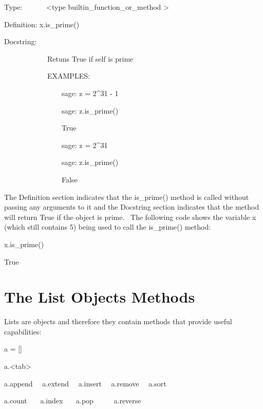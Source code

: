 \documentclass[12pt,twoside]{book}
\begin{document}
Type: \ \ \ \ \ \ {\textless}type {\textquotesingle}builtin\_function\_or\_method {\textquotesingle}{\textgreater}

Definition: x.is\_prime()


\bigskip

Docstring: 


\bigskip

\ \ \ \ \ \ \ \ \ \ \ \ Retuns True if self is prime 


\bigskip

\ \ \ \ \ \ \ \ \ \ \ \ EXAMPLES: 

\ \ \ \ \ \ \ \ \ \ \ \ \ \ \ \ sage: z = 2\^{}31 {}- 1 

\ \ \ \ \ \ \ \ \ \ \ \ \ \ \ \ sage: z.is\_prime() 

\ \ \ \ \ \ \ \ \ \ \ \ \ \ \ \ True 

\ \ \ \ \ \ \ \ \ \ \ \ \ \ \ \ sage: z = 2\^{}31 

\ \ \ \ \ \ \ \ \ \ \ \ \ \ \ \ sage: z.is\_prime() 

\ \ \ \ \ \ \ \ \ \ \ \ \ \ \ \ False 


\bigskip

The Definition section indicates that the is\_prime() method is called without passing any arguments to it and the Docstring section indicates that the method will return True if the object is prime. \ The following code shows the variable x (which still contains 5) being used to call the is\_prime() method: 

\bigskip

x.is\_prime()

{\textbar}

True

\section[The List Object{\textquotesingle}s Methods]{ The List Object{\textquotesingle}s Methods}

Lists are objects and therefore they contain methods that provide useful capabilities: 

\bigskip

a = []

a.{\textless}tab{\textgreater}

{\textbar}

a.append \ \ a.extend \ \ a.insert \ \ a.remove \ \ a.sort 

a.count \ \ \ a.index \ \ \ a.pop \ \ \ \ \ a.reverse 


\bigskip
\end{document}
